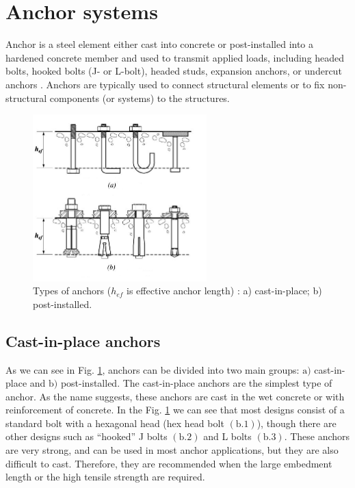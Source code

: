 \section{Anchor systems}
Anchor is a steel element either cast into concrete or post-installed into a hardened concrete member and used to transmit applied loads, including headed bolts, hooked bolts (J- or L-bolt), headed studs, expansion anchors, or undercut anchors \cite{anchors-ACI-318M}. Anchors are typically used to connect structural elements or to fix non-structural components (or systems) to the structures. 

\begin{figure}[h!]
	\centering
	\includegraphics[width=0.6\textwidth]{obrazky/anchor_types_repaired.png}
	\caption[Types of anchors]{Types of anchors ($h_{ef}$ is effective anchor length) \cite{anchors-ACI-318M}: a) cast-in-place; b) post-installed.}\label{obr:Anchors}
\end{figure}

\subsection{Cast-in-place anchors}
As we can see in Fig. \ref{obr:Anchors}, anchors can be divided into two main groups: $\mathrm{a)}$ cast-in-place and $\mathrm{b)}$ post-installed. The cast-in-place anchors are the simplest type of anchor. As the name suggests, these anchors are cast in the wet concrete or with reinforcement of concrete. In the Fig. \ref{obr:Anchors} we can see that most designs consist of a standard bolt with a hexagonal head (hex head bolt $\mathrm{(b.1)}$), though there are other designs such as “hooked” J bolts  $\mathrm{(b.2)}$ and L bolts $\mathrm{(b.3)}$. These anchors are very strong, and can be used in most anchor applications, but they are also difficult to cast. Therefore, they are recommended when the large embedment length or the  high tensile strength are required.

